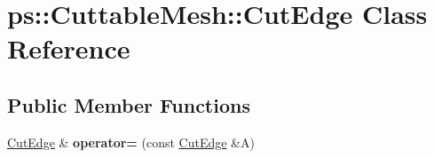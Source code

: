 \hypertarget{classps_1_1CuttableMesh_1_1CutEdge}{}\section{ps\+:\+:Cuttable\+Mesh\+:\+:Cut\+Edge Class Reference}
\label{classps_1_1CuttableMesh_1_1CutEdge}
\subsection*{Public Member Functions}
\begin{DoxyCompactItemize}
\item 
\hypertarget{classps_1_1CuttableMesh_1_1CutEdge_aaa3f624152d7e99b71ee84cbb019f723}{}\hyperlink{classps_1_1CuttableMesh_1_1CutEdge}{Cut\+Edge} \& {\bfseries operator=} (const \hyperlink{classps_1_1CuttableMesh_1_1CutEdge}{Cut\+Edge} \&A)\label{classps_1_1CuttableMesh_1_1CutEdge_aaa3f624152d7e99b71ee84cbb019f723}

\end{DoxyCompactItemize}
